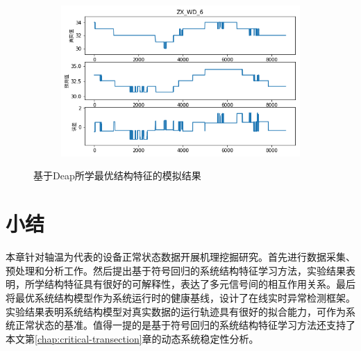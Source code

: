 \begin{figure}[H]
\begin{subfigure}[t]{0.48\textwidth}
\end{subfigure}\hfill
\begin{subfigure}[t]{0.48\textwidth}
    \centering
    \includegraphics[scale=0.45]{figures/sr/deap-zw_wd_6.png}
\end{subfigure}
\caption{基于Deap所学最优结构特征的模拟结果}
\label{fig:deap_zx_wd}
\end{figure}

\section{小结}

本章针对轴温为代表的设备正常状态数据开展机理挖掘研究。首先进行数据采集、预处理和分析工作。然后提出基于符号回归的系统结构特征学习方法，实验结果表明，所学结构特征具有很好的可解释性，表达了多元信号间的相互作用关系。最后将最优系统结构模型作为系统运行时的健康基线，设计了在线实时异常检测框架。实验结果表明系统结构模型对真实数据的运行轨迹具有很好的拟合能力，可作为系统正常状态的基准。值得一提的是基于符号回归的系统结构特征学习方法还支持了本文第\ref{chap:critical-transection}章的动态系统稳定性分析。


